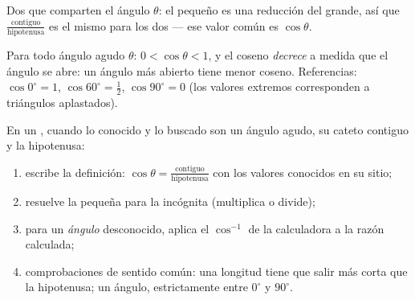 \begin{omfigure}

{\small Dos  que comparten el ángulo $\theta$: el pequeño
es una reducción del grande, así que
$\frac{\text{contiguo}}{\text{hipotenusa}}$ es el mismo para los dos ---
ese valor común es $\cos\theta$.}
\end{omfigure}

\begin{proposition}\label{prop:g8:cosine:bounds}
Para todo ángulo agudo $\theta$: $0 < \cos\theta < 1$, y el coseno
\emph{decrece} a medida que el ángulo se abre: un ángulo más abierto tiene menor
coseno. Referencias: $\cos 0^\circ = 1$, $\cos 60^\circ = \frac12$,
$\cos 90^\circ = 0$ (los valores extremos corresponden a triángulos
aplastados).
\end{proposition}
\admitted

\begin{method}\label{met:g8:cosine:use}
En un , cuando lo conocido y lo buscado son un
ángulo agudo, su cateto contiguo y la hipotenusa:
\begin{enumerate}
  \item escribe la definición:
        $\cos\theta = \frac{\text{contiguo}}{\text{hipotenusa}}$ con
        los valores conocidos en su sitio;
  \item resuelve la pequeña  para la incógnita (multiplica o divide);
  \item para un \emph{ángulo} desconocido, aplica el $\cos^{-1}$ de la
        calculadora a la razón calculada;
  \item comprobaciones de sentido común: una longitud tiene que salir más corta que la
        hipotenusa; un ángulo, estrictamente entre $0^\circ$ y
        $90^\circ$.
\end{enumerate}
\end{method}


